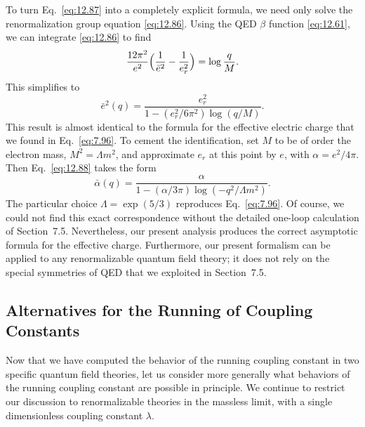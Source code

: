 To turn Eq.~\eqref{eq:12.87} into a completely explicit formula, we need only
solve the renormalization group equation \eqref{eq:12.86}.  Using the QED
$\beta$ function \eqref{eq:12.61}, we can integrate \eqref{eq:12.86} to find
\begin{equation}
  \frac{12\pi^2}{e^2}\Bigl( \frac{1}{\bar{e}^2} - \frac{1}{e_r^2} \Bigr)
  = \log\frac{q}{M} .
\end{equation}
This simplifies to
\begin{equation}
  \bar{e}^2(q) = \frac{e_r^2}{1 - (e_r^2/6\pi^2)\log(q/M)} .
  \label{eq:12.88}
\end{equation}
This result is almost identical to the formula for the effective electric
charge that we found in Eq.~\eqref{eq:7.96}.  To cement the identification,
set $M$ to be of order the electron mass, $M^2 = \Lambda m^2$, and
approximate $e_r$ at this point by $e$, with $\alpha = e^2/4\pi$.  Then
Eq.~\eqref{eq:12.88} takes the form
\begin{equation}
  \bar{\alpha}(q) = \frac{\alpha}{1 - (\alpha/3\pi)\log(-q^2/\Lambda m^2)} .
  \label{eq:12.89}
\end{equation}
The particular choice $\Lambda = \exp(5/3)$ reproduces Eq.~\eqref{eq:7.96}.
Of course, we could not find this exact correspondence without the detailed
one-loop calculation of Section~7.5.  Nevertheless, our present analysis
produces the correct asymptotic formula for the effective charge.
Furthermore, our present formalism can be applied to any renormalizable
quantum field theory; it does not rely on the special symmetries of QED that
we exploited in Section~7.5.

\subsection{Alternatives for the Running of Coupling Constants}

Now that we have computed the behavior of the running coupling constant in
two specific quantum field theories, let us consider more generally what
behaviors of the running coupling constant are possible in principle.  We
continue to restrict our discussion to renormalizable theories in the massless
limit, with a single dimensionless coupling constant $\lambda$.

